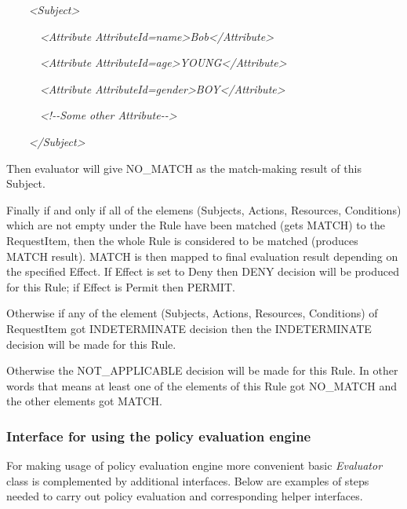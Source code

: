 \documentclass[a4paper]{article}
\begin{document}
{\itshape\color{black}
\ \ \ \ {\textless}Subject{\textgreater}}

{\itshape\color{black}
\ \ \ \ \ \ {\textless}Attribute
AttributeId={\textquotedbl}name{\textquotedbl}{\textgreater}Bob{\textless}/Attribute{\textgreater}}

{\itshape\color{black}
\ \ \ \ \ \ {\textless}Attribute
AttributeId={\textquotedbl}age{\textgreater}YOUNG{\textless}/Attribute{\textgreater}}

{\itshape\color{black}
\ \ \ \ \ \ {\textless}Attribute
AttributeId={\textquotedbl}gender{\textquotedbl}{\textgreater}BOY{\textless}/Attribute{\textgreater}}

{\itshape\color{black}
\ \ \ \ \ \ {\textless}!-{}-Some other Attribute-{}-{\textgreater}}

{\itshape\color{black}
\ \ \ \ {\textless}/Subject{\textgreater}}

{\color{black}
Then evaluator will give NO\_MATCH as the match-making result of this
Subject.}

{\color{black}
Finally if and only if all of the elemens (Subjects, Actions, Resources,
Conditions) which are not empty under the Rule have been matched (gets
MATCH) to the RequestItem, then the whole Rule is considered to be
matched (produces MATCH result). MATCH is then mapped to final
evaluation result depending on the specified Effect. If Effect is set
to Deny then DENY decision will be produced for this Rule; if Effect is
Permit then PERMIT.}

{\color{black}
Otherwise if any of the element (Subjects, Actions, Resources,
Conditions) of RequestItem got INDETERMINATE decision then the
INDETERMINATE decision will be made for this Rule.}

{\color{black}
Otherwise the NOT\_APPLICABLE decision will be made for this Rule. In
other words that means at least one of the elements of this Rule got
NO\_MATCH and the other elements got MATCH.}

\subsubsection{Interface for using the policy evaluation engine}
{\upshape\color{black}
For making usage of policy evaluation engine more convenient basic
\textit{Evaluator} class is complemented by additional interfaces.
Below are examples of steps needed to carry out policy evaluation and
corresponding helper interfaces.}
\end{document}
